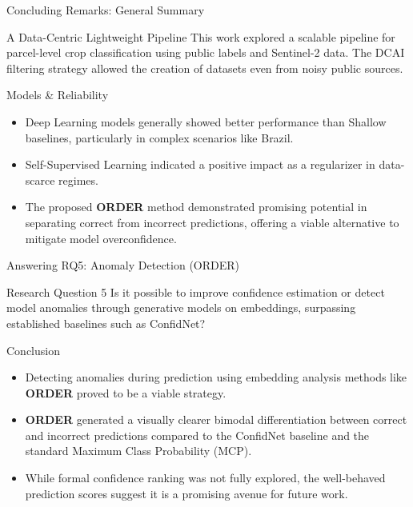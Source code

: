\documentclass{beamer}
\begin{document}
\begin{frame}{Concluding Remarks: General Summary}
    \begin{block}{A Data-Centric Lightweight Pipeline}
        This work explored a scalable pipeline for parcel-level crop classification using public labels and Sentinel-2 data. The DCAI filtering strategy allowed the creation of datasets even from noisy public sources.
    \end{block}

    \pause

    \begin{block}{Models \& Reliability}
        \begin{itemize}
            \item Deep Learning models generally showed better performance than Shallow baselines, particularly in complex scenarios like Brazil.
            \item Self-Supervised Learning indicated a positive impact as a regularizer in data-scarce regimes.
            \item The proposed \textbf{ORDER} method demonstrated promising potential in separating correct from incorrect predictions, offering a viable alternative to mitigate model overconfidence.
        \end{itemize}
    \end{block}
\end{frame}

\begin{frame}{Answering RQ5: Anomaly Detection (ORDER)}
    \begin{block}{Research Question 5}
        Is it possible to improve confidence estimation or detect model anomalies through generative models on embeddings, surpassing established baselines such as ConfidNet?
    \end{block}

    \begin{block}{Conclusion}
        \begin{itemize}
            \item Detecting anomalies during prediction using embedding analysis methods like \textbf{ORDER} proved to be a viable strategy.
            \item \textbf{ORDER} generated a visually clearer bimodal differentiation between correct and incorrect predictions compared to the ConfidNet baseline and the standard Maximum Class Probability (MCP).
            \item While formal confidence ranking was not fully explored, the well-behaved prediction scores suggest it is a promising avenue for future work.
        \end{itemize}
    \end{block}
\end{frame}
\end{document}
